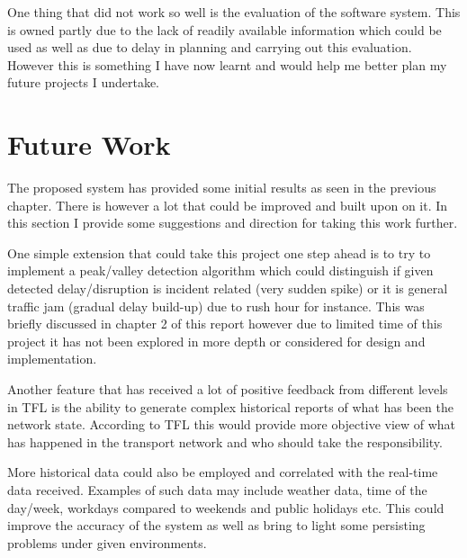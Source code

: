 One thing that did not work so well is the evaluation of the software system. This is owned partly due to the lack of readily available information which could be used as well as due to delay in planning and carrying out this evaluation. However this is something I have now learnt and would help me better plan my future projects I undertake.


\section{Future Work}
The proposed system has provided some initial results as seen in the previous chapter. There is however a lot that could be improved and built upon on it. In this section I provide some suggestions and direction for taking this work further.

One simple extension that could take this project one step ahead is to try to implement a peak/valley detection algorithm which could distinguish if given detected delay/disruption is incident related (very sudden spike) or it is general traffic jam (gradual delay build-up) due to rush hour for instance. This was briefly discussed in chapter 2 of this report however due to limited time of this project it has not been explored in more depth or considered for design and implementation.

Another feature that has received a lot of positive feedback from different levels in TFL is the ability to generate complex historical reports of what has been the network state. According to TFL this would provide more objective view of what has happened in the transport network and who should take the responsibility. 

More historical data could also be employed and correlated with the real-time data received. Examples of such data may include weather data, time of the day/week, workdays compared to weekends and public holidays etc. This could improve the accuracy of the system as well as bring to light some persisting problems under given environments.

